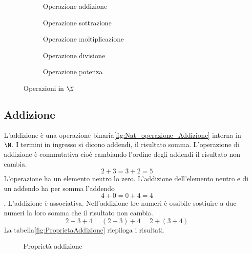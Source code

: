 \begin{figure} 
\begin{subfigure}[b]{.5\linewidth}
		\centering

	\caption{Operazione addizione}
	\label{fig:Nat_operazione_Addizione}
\end{subfigure}%
\begin{subfigure}[b]{.5\linewidth}
	\centering

	\caption{Operazione sottrazione}
	\label{fig:Nat_operazione_Sottrazione}
\end{subfigure}
	\begin{subfigure}[b]{.5\linewidth}
	\centering

	\caption{Operazione moltiplicazione}
	\label{fig:Nat_operazione_Moltiplicazione}
	\end{subfigure}
	\begin{subfigure}[b]{.5\linewidth}
	\centering

	\caption{Operazione divisione}
	\label{fig:Nat_operazione_Divisione}
	\end{subfigure}
		\begin{subfigure}[b]{.5\linewidth}
		\centering
	
		\caption{Operazione potenza}
		\label{fig:Nat_operazione_Potenza}
		\end{subfigure}
	\caption{Operazioni in $\N$}
	\label{fig:OperazioniinN}
\end{figure}
\subsection{Addizione}
\label{sec:NumerinatADD}
L'addizione è una operazione binaria\nobs\vref{fig:Nat_operazione_Addizione}  interna in $\N$. I termini in ingresso si dicono addendi, il risultato somma. L'operazione di  addizione è commutativa cioè cambiando l'ordine degli addendi il risultato non cambia. \[2+3=3+2=5\] L'operazione ha un elemento neutro lo zero. L'addizione dell'elemento neutro e di un addendo ha per somma l'addendo  \[4+0=0+4=4\]. L'addizione è associativa. Nell'addizione tre numeri è ossibile sostiuire a due numeri la loro somma che il risultato non  cambia.\[2+3+4=(2+3)+4=2+(3+4)\] La tabella\nobs\vref{fig:ProprietaAddizione} riepiloga i risultati.
\begin{figure} %
	\centering

	\caption{Proprietà addizione}
	\label{fig:ProprietaAddizione}\end{figure}

